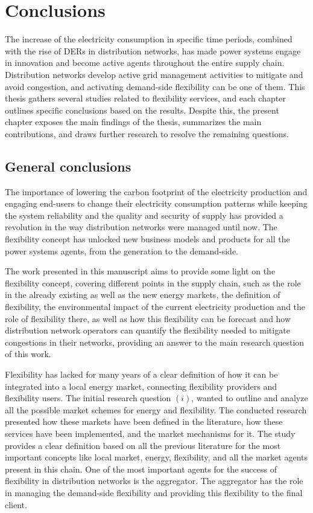 
\chapter{Conclusions}
\label{conclus}
	The increase of the electricity consumption in specific time periods, combined with the rise of DERs in distribution networks, has made power systems engage in innovation and become active agents throughout the entire supply chain. Distribution networks develop active grid management activities to mitigate and avoid congestion, and activating demand-side flexibility can be one of them. 
    This thesis gathers several studies related to flexibility services, and each chapter outlines specific conclusions based on the results. Despite this, the present chapter exposes the main findings of the thesis, summarizes the main contributions, and draws further research to resolve the remaining questions. 

\section{General conclusions}
The importance of lowering the carbon footprint of the electricity production and engaging end-users to change their electricity consumption patterns while keeping the system reliability and the quality and security of supply has provided a revolution in the way distribution networks were managed until now. The flexibility concept has unlocked new business models and products for all the power systems agents, from the generation to the demand-side.

The work presented in this manuscript aims to provide some light on the flexibility concept, covering different points in the supply chain, such as the role in the already existing as well as the new energy markets, the definition of flexibility, the environmental impact of the current electricity production and the role of flexibility there, as well as how this flexibility can be forecast and how distribution network operators can quantify the flexibility needed to mitigate congestions in their networks, providing an answer to the main research question of this work. 

Flexibility has lacked for many years of a clear definition of how it can be integrated into a local energy market, connecting flexibility providers and flexibility users. The initial research question $(i)$, wanted to outline and analyze all the possible market schemes for energy and flexibility. The conducted research presented how these markets have been defined in the literature, how these services have been implemented, and the market mechanisms for it. The study provides a clear definition based on all the previous literature for the most important concepts like local market, energy, flexibility, and all the market agents present in this chain. One of the most important agents for the success of flexibility in distribution networks is the aggregator. The aggregator has the role in managing the demand-side flexibility and providing this flexibility to the final client.

